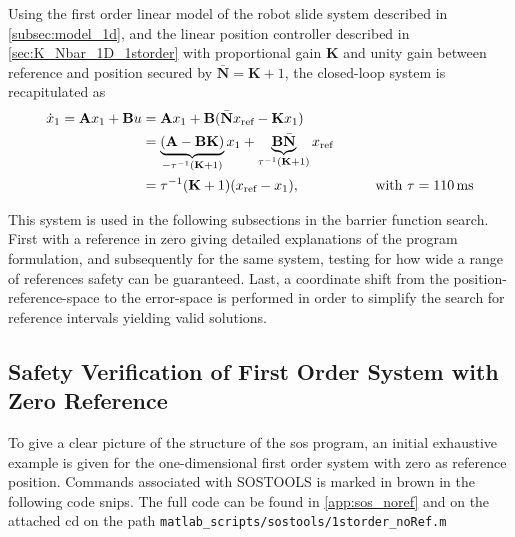 Using the first order linear model of the robot slide system described in \autoref{subsec:model_1d}, and  the linear position controller described in \autoref{sec:K_Nbar_1D_1storder} with proportional gain \textbf{K} and unity gain between reference and position secured by $\bar{\mathbf{N}}=\textbf{K}+1$, %
the closed-loop system is recapitulated as
\vspace{-1mm}
\begin{align}
\dot{x}_1 = \textbf{A}x_1+\textbf{B}u &= \textbf{A}x_1+\textbf{B}(\bar{\mathbf{N}}x_\text{ref}-\textbf{K}x_1)\nonumber\\
&= \underbrace{(\textbf{A} - \textbf{B}\textbf{K})}_{-\tau^{-1}(\textbf{K}+1)} x_1 + \underbrace{\textbf{B}\bar{\textbf{N}}}_{\tau^{-1}(\textbf{K}+1)} x_\text{ref} \nonumber\\
& = %
\tau^{-1}(\mathbf{K}+1)(x_\text{ref}-x_1),
\kk\kk\mm \text{with }\tau=110\,\text{ms}\label{eq:sos_firstorder}
\end{align}


This system is used in the following subsections in the barrier function search.
First with a reference in zero giving detailed explanations of the program formulation, and subsequently for the same system, testing for how wide a range of references safety can be guaranteed. Last, a coordinate shift from the position-reference-space to the error-space is performed in order to simplify the search for reference intervals yielding valid solutions.

\subsection{Safety Verification of First Order System with Zero Reference}\label{subsec:zeroref}
To give a clear picture of the structure of the \gls{sos} program, an initial exhaustive example is given for the  one-dimensional first order system with zero as reference position. Commands associated with SOSTOOLS is marked in brown in the following code snips. The full code can be found in \autoref{app:sos_noref} and on the attached cd on the path \texttt{matlab\_scripts/sostools/1storder\_noRef.m}

